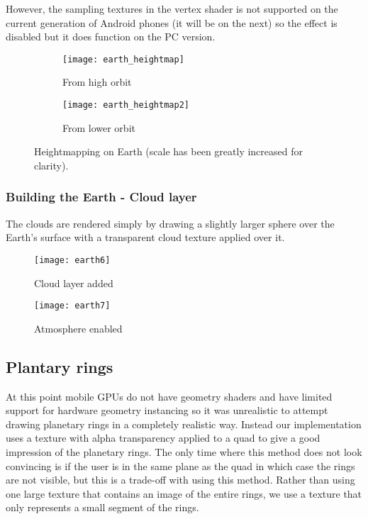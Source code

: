 However, the sampling textures in the vertex shader is not supported on the current generation of Android phones (it will be on the next) so the effect is disabled but it does function on the PC version.
\\
\begin{figure}[!htbp]
\centering
\begin{subfigure}{.5\textwidth}
  \centering
  \texttt{[image: earth\_heightmap]}
  \caption{From high orbit}
  \label{fig:earthhm1}
\end{subfigure}%
\begin{subfigure}{.5\textwidth}
  \centering
  \texttt{[image: earth\_heightmap2]}
  \caption{From lower orbit}
  \label{fig:earthhm2}
\end{subfigure}
\caption{Heightmapping on Earth (scale has been greatly increased for clarity).}
\label{fig:earthhms2}
\end{figure}

\subsubsection{Building the Earth - Cloud layer}

The clouds are rendered simply by drawing a slightly larger sphere over the Earth's surface with a transparent cloud texture applied over it.

\begin{figure}[!htbp]
\centering
\begin{minipage}{.5\textwidth}
  \centering
  \texttt{[image: earth6]}
  \caption{Cloud layer added}
  \label{fig:earth6}
\end{minipage}%
\begin{minipage}{.5\textwidth}
  \centering
  \texttt{[image: earth7]}
  \caption{Atmosphere enabled}
  \label{fig:earth7}
\end{minipage}
\end{figure}

\pagebreak
\subsection{Plantary rings}
\label{planetaryrings}

At this point mobile GPUs do not have geometry shaders and have limited support for hardware geometry instancing so it was unrealistic
to attempt drawing planetary rings in a completely realistic way. Instead our implementation uses a texture with alpha transparency applied to a quad
to give a good impression of the planetary rings. The only time where this method does not look convincing is if the user is in the same plane as the quad in which case the rings are not visible, but this is a trade-off with using this method. Rather than using one large texture that contains an image of the entire rings, we use a texture that only represents a small segment of the rings.

